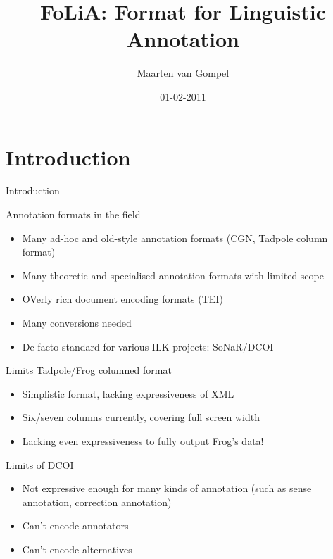 \documentclass[compress]{beamer}
\title{FoLiA: Format for Linguistic Annotation}
\author{Maarten van Gompel}
\date{01-02-2011}
\begin{document}
\begin{frame}
	\titlepage\smallraccoon\ilkuvt
\end{frame}

\section{Introduction}

\begin{frame}{Introduction}

    \begin{block}{Annotation formats in the field}
        \begin{itemize}
            \item Many ad-hoc and old-style annotation formats (CGN, Tadpole column format) 
            \item Many theoretic and specialised annotation formats with limited scope
            \item OVerly rich document encoding formats (TEI)
            \item Many conversions needed
            \item De-facto-standard for various ILK projects: SoNaR/DCOI
        \end{itemize}
    \end{block}
    
    \begin{block}{Limits Tadpole/Frog columned format}
        \begin{itemize}
            \item Simplistic format, lacking expressiveness of XML
            \item Six/seven columns currently, covering full screen width
            \item Lacking even expressiveness to fully output Frog's data!
        \end{itemize}
    \end{block}

    \begin{block}{Limits of DCOI}
        \begin{itemize}
            \item Not expressive enough for many kinds of annotation (such as sense annotation, correction annotation)
            \item Can't encode annotators
            \item Can't encode alternatives
        \end{itemize}
    \end{block}

\end{frame}
\end{document}
